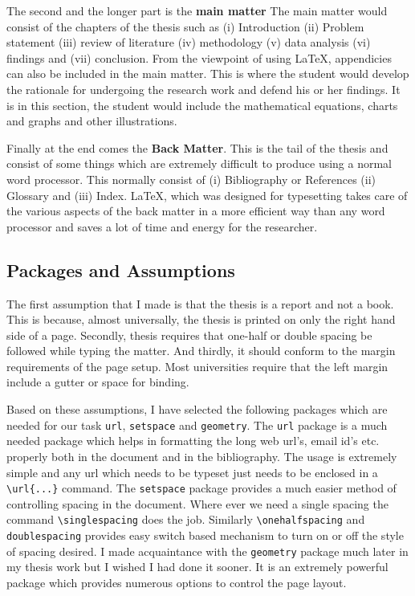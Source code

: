 \documentclass{pracjourn}
\begin{document}
The second and the longer part is the \textbf{main matter} The main matter
would consist of the chapters of the thesis such as (i) Introduction (ii)
Problem statement (iii) review of literature (iv) methodology (v) data analysis
(vi) findings and (vii) conclusion. From the viewpoint of using \LaTeX{},
appendicies can also be included in the main matter. This is where the student
would develop the rationale for undergoing the research work and defend his or
her findings. It is in this section, the student would include the mathematical
equations, charts and graphs and other illustrations.

Finally at the end comes the \textbf{Back Matter}. This is the tail of the
thesis and  consist of some things which are extremely difficult to produce
using a normal word processor. This normally consist of (i) Bibliography or
References (ii) Glossary and (iii) Index. \LaTeX{}, which was designed for
typesetting takes care of the various aspects of the back matter in a more
efficient way than any word processor and saves a lot of time and energy for
the researcher.

\subsection{Packages and Assumptions}

The first assumption that I made is that the thesis is a report and not a book.
This is because, almost universally, the thesis is printed on only the right
hand side of a page. Secondly, thesis requires that one-half or double spacing
be followed while typing the matter. And thirdly, it should conform to the
margin requirements of the page setup. Most universities require that the left
margin include a gutter or space for binding.

Based on these assumptions, I have selected the following packages which are
needed for our task  \dash \texttt{url}, \texttt{setspace} and
\texttt{geometry}. The \texttt{url} package is a much needed package which
helps in formatting the long web url's, email id's etc. properly both in the
document and in the bibliography. The usage is extremely simple and any url
which needs to be typeset just needs to be enclosed in a \verb|\url{...}|
command.  The \texttt{setspace} package provides a much easier method of
controlling spacing in the document. Where ever we need a single spacing the
command \verb|\singlespacing| does the job. Similarly \verb|\onehalfspacing|
and \verb|doublespacing| provides easy switch based mechanism to turn on or off
the style of spacing desired. I made acquaintance with the \texttt{geometry}
package much later in my thesis work but I wished I had done it sooner. It is
an extremely powerful package which provides numerous options to control the
page layout.
\end{document}
